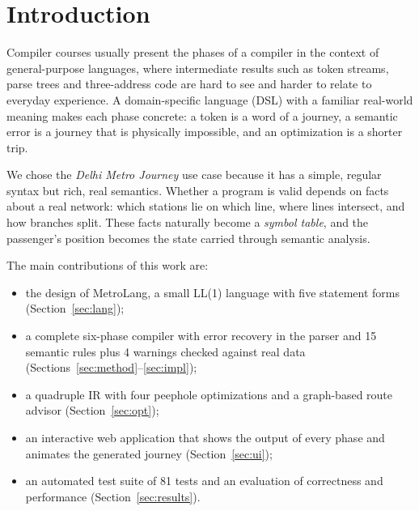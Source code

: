 \documentclass[conference]{IEEEtran}
\begin{document}
\section{Introduction}
Compiler courses usually present the phases of a compiler in the context of general-purpose languages, where intermediate results such as token streams, parse trees and three-address code are hard to see and harder to relate to everyday experience. A domain-specific language (DSL) with a familiar real-world meaning makes each phase concrete: a token is a word of a journey, a semantic error is a journey that is physically impossible, and an optimization is a shorter trip.

We chose the \emph{Delhi Metro Journey} use case because it has a simple, regular syntax but rich, real semantics. Whether a program is valid depends on facts about a real network: which stations lie on which line, where lines intersect, and how branches split. These facts naturally become a \emph{symbol table}, and the passenger's position becomes the state carried through semantic analysis.

The main contributions of this work are:
\begin{itemize}
\item the design of MetroLang, a small LL(1) language with five statement forms (Section~\ref{sec:lang});
\item a complete six-phase compiler with error recovery in the parser and 15 semantic rules plus 4 warnings checked against real data (Sections~\ref{sec:method}--\ref{sec:impl});
\item a quadruple IR with four peephole optimizations and a graph-based route advisor (Section~\ref{sec:opt});
\item an interactive web application that shows the output of every phase and animates the generated journey (Section~\ref{sec:ui});
\item an automated test suite of 81 tests and an evaluation of correctness and performance (Section~\ref{sec:results}).
\end{itemize}

\end{document}
